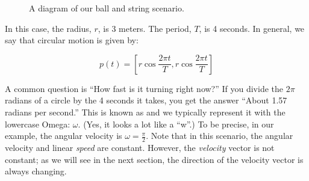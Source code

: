 \begin{figure}[htbp]
    \begin{center}
        
    \end{center}
        \caption{A diagram of our ball and string scenario.}
    \label{fig:billiardBall}
\end{figure}

In this case, the radius, $r$, is 3 meters.  The period, $T$, is 4
seconds.  In general, we say that circular motion is given by:

$$p(t) = \left[ r \cos{\frac{2 \pi t}{T}}, r \cos{\frac{2 \pi t}{T}}\right]$$

A common question is ``How fast is it turning right now?''  If you
divide the $2\pi$ radians of a circle by the 4 seconds it takes, you
get the answer ``About 1.57 radians per second.''  This is known as
 and we typically represent it with the
lowercase Omega: $\omega$. (Yes, it looks a lot like a ``w''.)  To be
precise, in our example, the angular velocity is $\omega = \frac{\pi}{2}$. Note that in this scenario, the angular velocity and linear \emph{speed} are constant. However, the \emph{velocity} vector is not constant; as we will see in the next section, the direction of the velocity vector is always changing.

